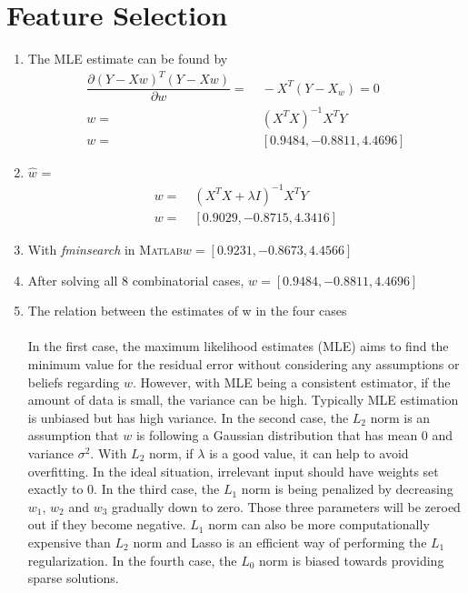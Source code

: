 \documentclass[english]{article}
\newcommand{\MATLAB}{\textsc{Matlab}\xspace}
\begin{document}
\section{Feature Selection}
\begin{enumerate}
  \item The MLE estimate can be found by\\
  \begin{align*}
  \dfrac{\partial(Y-Xw)^T(Y-Xw)}{\partial w} = &\; -X^T(Y-X_w) = 0\\
  w = &\; (X^TX)^{-1}X^TY\\
  w = &\; \boxed{[0.9484,-0.8811,4.4696]}
  \end{align*}
  \item $\hat{w}$ = \\
  \begin{align*}
  w = &\; (X^TX+\lambda I)^{-1}X^TY\\
  w = &\; \boxed{[0.9029, -0.8715,4.3416]}
  \end{align*}

  \item With \textit{fminsearch} in \MATLAB $w = \boxed{[0.9231,-0.8673, 4.4566]}$

  \item After solving all 8 combinatorial cases, $w = \boxed{[0.9484,-0.8811,4.4696]}$

  \item The relation between the estimates of w in the four cases\\\\
  In the first case, the maximum likelihood estimates (MLE) aims to find the minimum value for the residual error without considering any assumptions or beliefs regarding $w$. However, with MLE being a consistent estimator, if the amount of data is small, the variance can be high. Typically MLE estimation is unbiased but has high variance. In the second case, the $L_2$ norm is an assumption that $w$ is following a Gaussian distribution that has mean 0 and variance $\sigma^2$. With $L_2$ norm, if $\lambda$ is a good value, it can help to avoid overfitting. In the ideal situation, irrelevant input should have weights set exactly to 0. In the third case, the $L_1$ norm is being penalized by decreasing $w_1$, $w_2$ and $w_3$ gradually down to zero. Those three parameters will be zeroed out if they become negative. $L_1$ norm can also be more computationally expensive than $L_2$ norm and Lasso is an efficient way of performing the $L_1$ regularization. In the fourth case, the $L_0$ norm is biased towards providing sparse solutions. 


\end{enumerate}
\end{document}
